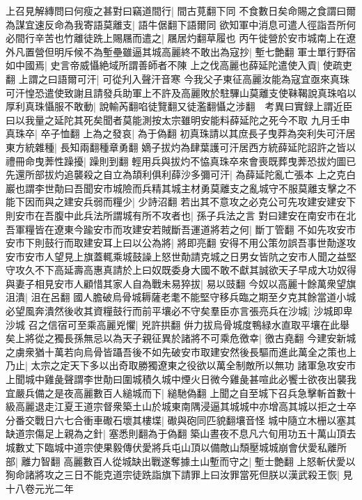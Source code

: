 上召見解縳問曰何瘦之甚對曰竊道間行|{
	間古莧翻下同}
不食數日矣命賜之食謂曰爾為謀宜速反命為我寄語莫離支|{
	語牛倨翻下語爾同}
欲知軍中消息可遣人徑詣吾所何必間行辛苦也竹離徒跣上賜屩而遣之|{
	屩居灼翻草履也}
丙午徙營於安市城南上在遼外凡置營但明斥候不為塹壘雖逼其城高麗終不敢出為寇抄|{
	塹七艶翻}
軍士單行野宿如中國焉|{
	史言帝威懾絶域所謂善師者不陳}
上之伐高麗也薛延陀遣使入貢|{
	使疏吏翻}
上謂之曰語爾可汗|{
	可從刋入聲汗音寒}
今我父子東征高麗汝能為寇宜亟來真珠可汗惶恐遣使致謝且請發兵助軍上不許及高麗敗於駐驆山莫離支使靺鞨說真珠啗以厚利真珠懾服不敢動|{
	說輸芮翻啗徒覽翻又徒濫翻懾之涉翻　考異曰實録上謂近臣曰以我量之延陀其死矣聞者莫能測按太宗雖明安能料薛延陀之死今不取}
九月壬申真珠卒|{
	卒子恤翻}
上為之發哀|{
	為于偽翻}
初真珠請以其庶長子曳莽為突利失可汗居東方統雜種|{
	長知兩翻種章勇翻}
嫡子拔灼為肆葉護可汗居西方統薛延陀詔許之皆以禮冊命曳莾性躁擾|{
	躁則到翻}
輕用兵與拔灼不恊真珠卒來會喪既葬曳莾恐拔灼圖已先還所部拔灼追襲殺之自立為頡利俱利薛沙多彌可汗|{
	為薛延陀亂亡張本}
上之克白巖也謂李世勣曰吾聞安市城險而兵精其城主材勇莫離支之亂城守不服莫離支擊之不能下因而與之建安兵弱而糧少|{
	少詩沼翻}
若出其不意攻之必克公可先攻建安建安下則安市在吾腹中此兵法所謂城有所不攻者也|{
	孫子兵法之言}
對曰建安在南安市在北吾軍糧皆在遼東今踰安市而攻建安若賊斷吾運道將若之何|{
	斷丁管翻}
不如先攻安市安市下則鼓行而取建安耳上曰以公為將|{
	將即亮翻}
安得不用公策勿誤吾事世勣遂攻安市安市人望見上旗蓋輒乘城鼓譟上怒世勣請克城之日男女皆阬之安市人聞之益堅守攻久不下高延壽高惠真請於上曰奴既委身大國不敢不獻其誠欲天子早成大功奴得與妻子相見安市人顧惜其家人自為戰未易猝拔|{
	易以豉翻}
今奴以高麗十餘萬衆望旗沮潰|{
	沮在呂翻}
國人膽破烏骨城耨薩老耄不能堅守移兵臨之期至夕克其餘當道小城必望風奔潰然後收其資糧鼓行而前平壤必不守矣羣臣亦言張亮兵在沙城|{
	沙城即卑沙城}
召之信宿可至乘高麗兇懼|{
	兇許拱翻}
倂力拔烏骨城度鴨緑水直取平壤在此舉矣上將從之獨長孫無忌以為天子親征異於諸將不可乘危徼幸|{
	徼古堯翻}
今建安新城之虜衆猶十萬若向烏骨皆躡吾後不如先破安市取建安然後長驅而進此萬全之策也上乃止|{
	太宗之定天下多以出奇取勝獨遼東之役欲以萬全制敵所以無功}
諸軍急攻安市上聞城中雞彘聲謂李世勣曰圍城積久城中煙火日微今雞彘甚喧此必饗士欲夜出襲我宜嚴兵備之是夜高麗數百人縋城而下|{
	縋馳偽翻}
上聞之自至城下召兵急擊斬首數十級高麗退走江夏王道宗督衆築土山於城東南隅浸逼其城城中亦增高其城以拒之士卒分番交戰日六七合衝車礮石壞其樓堞|{
	礮與砲同匹貌翻壤音怪}
城中隨立木栅以塞其缺道宗傷足上親為之針|{
	塞悉則翻為于偽翻}
築山晝夜不息凡六旬用功五十萬山頂去城數丈下臨城中道宗使果毅傳伏愛將兵屯山頂以備敵山頹壓城城崩會伏愛私離所部|{
	離力智翻}
高麗數百人從城缺出戰遂奪據土山塹而守之|{
	塹士艶翻}
上怒斬伏愛以狥命諸將攻之三日不能克道宗徒跣詣旗下請罪上曰汝罪當死但朕以漢武殺王恢|{
	見十八卷元光二年}
